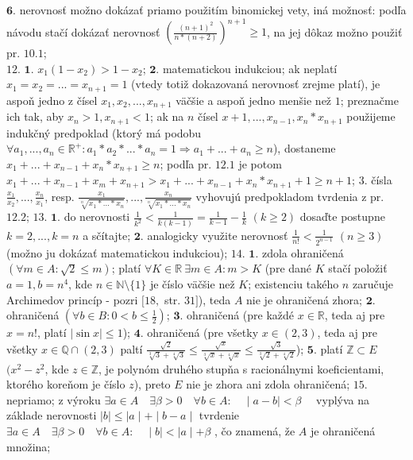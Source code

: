 $\boldsymbol{6.}$ nerovnosť možno dokázať priamo použitím binomickej vety, iná možnosť: podľa návodu stačí dokázať nerovnosť $(\frac{(n+1)^2}{n*(n+2)})^{n+1}\geq 1$, na jej dôkaz možno použiť pr. $10.1$;\\
$\boxed{12.}$ 
$\boldsymbol{1.}$ $x_1(1-x_2)>1-x_2$; $\boldsymbol{2.}$ matematickou indukciou; ak neplatí $x_1=x_2=...=x_{n+1}=1$ (vtedy totiž dokazovaná nerovnosť zrejme platí), je aspoň jedno z čísel $x_1,x_2,...,x_{n+1}$ väčšie a aspoň jedno menšie než $1$; preznačme ich tak, aby $x_n>1,x_{n+1}<1$; ak na $n$ čísel $x+1,...,x_{n-1},x_n*x_{n+1}$ použijeme indukčný predpoklad (ktorý má podobu $\forall a_1,...,a_n\in \mathbb{R^+}:a_1*a_2*...*a_n=1\Rightarrow a_1+...+a_n\geq n$), dostaneme $x_1+...+x_{n-1}+x_n*x_{n+1}\geq n$; podľa pr. $12.1$ je potom $x_1+...+x_{n-1}+x_m+x_{n+1}>x_1+...+x_{n-1}+x_n*x_{n+1}+1\geq n+1$;
$3.$ čísla $\frac{x_1}{x_2},...,\frac{x_n}{x_1}$, resp. $\frac{x_1}{\sqrt[n]{x_1*...*x_n}},...,\frac{x_n}{\sqrt[n]{x_1*...*x_n}}$ vyhovujú predpokladom tvrdenia z pr. $12.2$; 
$\boxed{13.}$
$\boldsymbol{1.}$ do nerovnosti $\frac{1}{k^2}<\frac{1}{k(k-1)}=\frac{1}{k-1}-\frac{1}{k}$ $(k\geq 2)$ dosaďte postupne $k=2,...,k=n$ a sčítajte; $\boldsymbol{2.}$ analogicky využite nerovnosť $\frac{1}{n!}<\frac{1}{2^{n-1}}$ $(n\geq 3)$ (možno ju dokázať matematickou indukciou);
$\boxed{14.}$
$\boldsymbol{1.}$ zdola ohraničená $(\forall m\in A:\sqrt{2}\leq m)$; platí $\forall K\in\mathbb{R}\ \exists m\in A:m>K$ (pre dané $K$ stačí položiť $a=1,b=n^4$, kde $n\in\mathbb{N}\setminus \{1\}$ je číslo väčšie než $K$; existenciu takého $n$ zaručuje Archimedov princíp - pozri $[18,$ str. $31]$), teda $A$ nie je ohraničená zhora; $\boldsymbol{2.}$ ohraničená $(\forall b\in B: 0<b\leq \frac{1}{2})$; $\boldsymbol{3.}$ ohraničená (pre každé $x\in\mathbb{R}$, teda aj pre $x=n!$, platí $|\sin x|\leq 1$); $\boldsymbol{4.}$ ohraničená (pre všetky $x\in (2,3)$, teda aj pre všetky $x\in\mathbb{Q}\cap (2,3)$ paltí $\frac{\sqrt{2}}{\sqrt[3]{3}+\sqrt[4]{3}}\leq \frac{\sqrt{x}}{\sqrt[3]{x}+\sqrt[4]{x}}\leq \frac{\sqrt{3}}{\sqrt[3]{2}+\sqrt[4]{2}}$); $\boldsymbol{5.}$ platí $\mathbb{Z}\subset E$ $(x^2-z^2$, kde $z\in\mathbb{Z}$, je polynóm druhého stupňa s racionálnymi koeficientami, ktorého koreňom je číslo $z$), preto $E$ nie je zhora ani zdola ohraničená;
$\boxed{15.}$
nepriamo; z výroku $ \exists a\in A \quad \exists \beta > 0  \quad \forall b \in A : \quad \mid a - b \mid < \beta \quad $ vyplýva na základe nerovnosti $ \mid b \mid \leq \mid a \mid + \mid b - a \mid  $ tvrdenie $ \exists a\in A \quad \exists \beta > 0  \quad \forall b \in A : \quad \mid b \mid < \mid a \mid + \beta$ , čo znamená, že $ A $ je ohraničená množina; 
